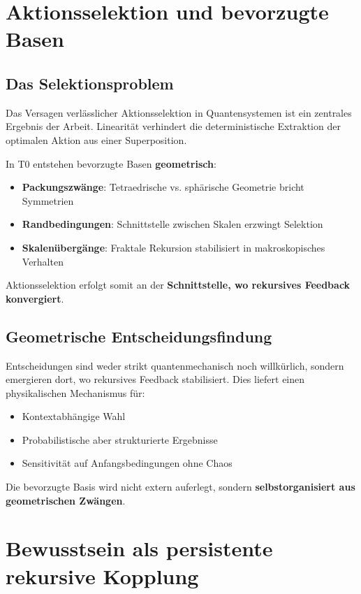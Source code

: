 	\section{Aktionsselektion und bevorzugte Basen}
	
	\subsection{Das Selektionsproblem}
	
	Das Versagen verlässlicher Aktionsselektion in Quantensystemen ist ein zentrales Ergebnis der Arbeit. Linearität verhindert die deterministische Extraktion der optimalen Aktion aus einer Superposition.
	
	In T0 entstehen bevorzugte Basen \textbf{geometrisch}:
	
	\begin{itemize}
		\item \textbf{Packungszwänge}: Tetraedrische vs. sphärische Geometrie bricht Symmetrien
		\item \textbf{Randbedingungen}: Schnittstelle zwischen Skalen erzwingt Selektion
		\item \textbf{Skalenübergänge}: Fraktale Rekursion stabilisiert in makroskopisches Verhalten
	\end{itemize}
	
	Aktionsselektion erfolgt somit an der \textbf{Schnittstelle, wo rekursives Feedback konvergiert}.
	
	\subsection{Geometrische Entscheidungsfindung}
	
	Entscheidungen sind weder strikt quantenmechanisch noch willkürlich, sondern emergieren dort, wo rekursives Feedback stabilisiert. Dies liefert einen physikalischen Mechanismus für:
	
	\begin{itemize}
		\item Kontextabhängige Wahl
		\item Probabilistische aber strukturierte Ergebnisse
		\item Sensitivität auf Anfangsbedingungen ohne Chaos
	\end{itemize}
	
	Die bevorzugte Basis wird nicht extern auferlegt, sondern \textbf{selbstorganisiert aus geometrischen Zwängen}.
	
	\section{Bewusstsein als persistente rekursive Kopplung}
	
